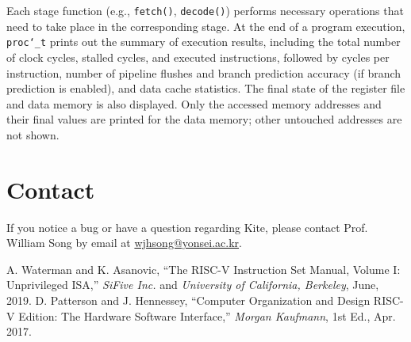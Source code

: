 \documentclass[10pt]{article}
\begin{document}
\begin{itemize}
    Each stage function (e.g., {\tt\small fetch()}, {\tt\small decode()}) performs necessary operations that need to take place in the corresponding stage.
    At the end of a program execution, {\tt\small proc\char`_t} prints out the summary of execution results, including the total number of clock cycles, stalled cycles, and executed instructions, followed by cycles per instruction, number of pipeline flushes and branch prediction accuracy (if branch prediction is enabled), and data cache statistics.
    The final state of the register file and data memory is also displayed.
    Only the accessed memory addresses and their final values are printed for the data memory; other untouched addresses are not shown.
\end{itemize}


\section{Contact} \label{sec:contact}
If you notice a bug or have a question regarding Kite, please contact Prof. William Song by email at \href{mailto:wjhsong@yonsei.ac.kr}{wjhsong@yonsei.ac.kr}.


\begin{thebibliography}{2}
    A. Waterman and K. Asanovic, 
    ``The RISC-V Instruction Set Manual, Volume I: Unprivileged ISA,''
    \emph{SiFive Inc.} and \emph{University of California, Berkeley},
    June, 2019.
    D. Patterson and J. Hennessey,
    ``Computer Organization and Design RISC-V Edition: The Hardware Software Interface,''
    \emph{Morgan Kaufmann}, 1st Ed.,
    Apr. 2017.
\end{thebibliography}
\end{document}
